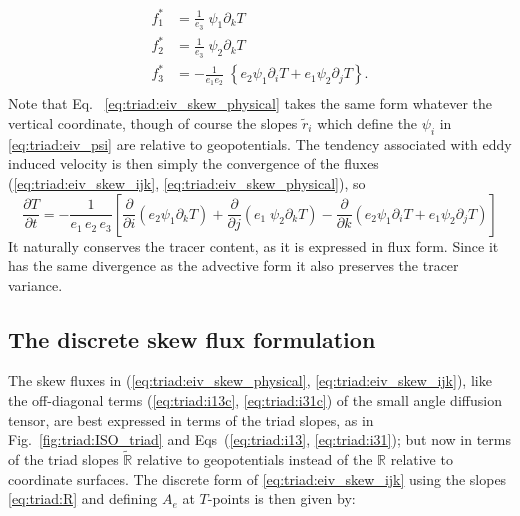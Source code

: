 \begin{equation}\label{eq:triad:eiv_skew_physical}
\begin{split}
 f^*_1 & = \frac{1}{e_{3}}\; \psi_1 \partial_k T   \\
 f^*_2 & = \frac{1}{e_{3}}\; \psi_2 \partial_k T   \\
 f^*_3 & =  -\frac{1}{e_{1}e_{2}}\; \left\{ e_{2} \psi_1 \partial_i T
   + e_{1} \psi_2 \partial_j T \right\}. \\
\end{split}
\end{equation}
Note that Eq.~ \eqref{eq:triad:eiv_skew_physical} takes the same form whatever the
vertical coordinate, though of course the slopes
$\tilde{r}_i$ which define the $\psi_i$ in \eqref{eq:triad:eiv_psi} are relative to geopotentials.
The tendency associated with eddy induced velocity is then simply the convergence
of the fluxes (\ref{eq:triad:eiv_skew_ijk}, \ref{eq:triad:eiv_skew_physical}), so
\begin{equation} \label{eq:triad:skew_eiv_conv}
\frac{\partial T}{\partial t}= -\frac{1}{e_1 \, e_2 \, e_3 }      \left[
  \frac{\partial}{\partial i} \left( e_2 \psi_1 \partial_k T\right)
  + \frac{\partial}{\partial j} \left( e_1  \;
    \psi_2 \partial_k T\right)
 -  \frac{\partial}{\partial k} \left( e_{2} \psi_1 \partial_i T
   + e_{1} \psi_2 \partial_j T \right)  \right]
\end{equation}
 It naturally conserves the tracer content, as it is expressed in flux
 form. Since it has the same divergence as the advective form it also
 preserves the tracer variance.

\subsection{The discrete skew flux formulation}
The skew fluxes in (\ref{eq:triad:eiv_skew_physical}, \ref{eq:triad:eiv_skew_ijk}), like the off-diagonal terms
(\ref{eq:triad:i13c}, \ref{eq:triad:i31c}) of the small angle diffusion tensor, are best
expressed in terms of the triad slopes, as in Fig.~\ref{fig:triad:ISO_triad}
and Eqs~(\ref{eq:triad:i13}, \ref{eq:triad:i31}); but now in terms of the triad slopes
$\tilde{\mathbb{R}}$ relative to geopotentials instead of the
$\mathbb{R}$ relative to coordinate surfaces. The discrete form of
\eqref{eq:triad:eiv_skew_ijk} using the slopes \eqref{eq:triad:R} and
defining $A_e$ at $T$-points is then given by:


